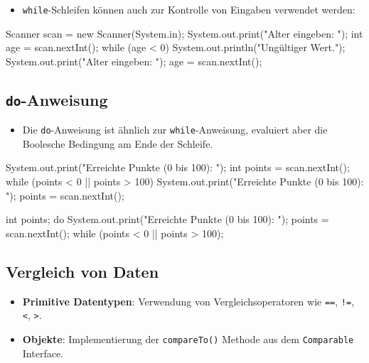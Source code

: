 \documentclass[a4paper,10pt, dvipsnames]{report}
\newcommand{\javaInLine}[1]{\texttt{#1}}
\begin{document}
\begin{itemize}
    \item \javaInLine{while}-Schleifen können auch zur Kontrolle von Eingaben verwendet werden:
\end{itemize}

\begin{javacodebox}
    Scanner scan = new Scanner(System.in);
    System.out.print("Alter eingeben: ");
    int age = scan.nextInt();
    while (age < 0) {
        System.out.println("Ungültiger Wert.");
        System.out.print("Alter eingeben: ");
        age = scan.nextInt();
    }
\end{javacodebox}

\subsection{\javaInLine{do}-Anweisung}

\begin{itemize}
    \item Die \javaInLine{do}-Anweisung ist ähnlich zur \javaInLine{while}-Anweisung, evaluiert aber die Boolesche Bedingung am Ende der Schleife.
\end{itemize}

\begin{javacodebox}
    System.out.print("Erreichte Punkte (0 bis 100): ");
    int points = scan.nextInt();
    while (points < 0 || points > 100) {
        System.out.print("Erreichte Punkte (0 bis 100): ");
        points = scan.nextInt();
    }
\end{javacodebox}

\begin{javacodebox}
    int points;
    do {
        System.out.print("Erreichte Punkte (0 bis 100): ");
        points = scan.nextInt();
    } while (points < 0 || points > 100);
\end{javacodebox}

\subsection{Vergleich von Daten}

\begin{itemize}
    \item \textbf{Primitive Datentypen}: Verwendung von Vergleichsoperatoren wie \javaInLine{==}, \javaInLine{!=}, \javaInLine{<}, \javaInLine{>}.
    \item \textbf{Objekte}: Implementierung der \javaInLine{compareTo()} Methode aus dem \javaInLine{Comparable} Interface.
\end{itemize}
\end{document}
